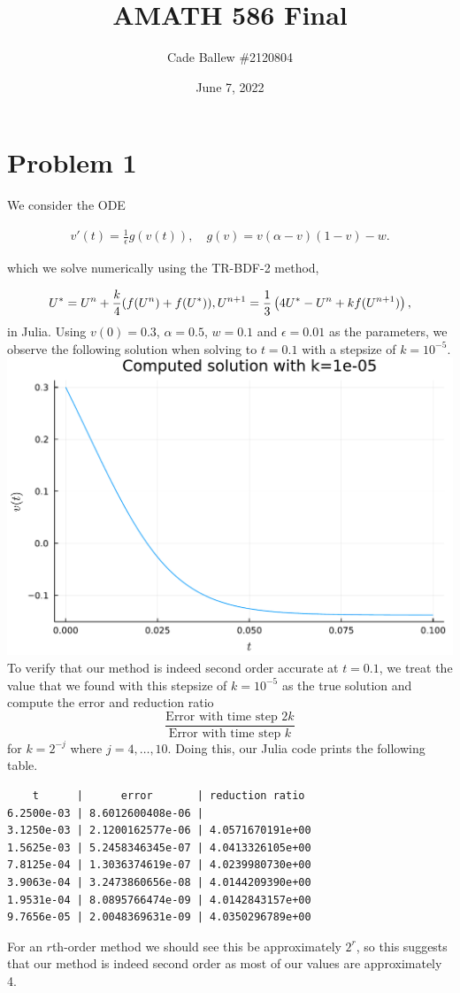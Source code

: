 \documentclass{article}
\title{AMATH 586 Final}
\author{Cade Ballew \#2120804}
\date{June 7, 2022}
\begin{document}
	
\maketitle
	
\section{Problem 1}
We consider the ODE 

\begin{align*} v'(t) = \frac 1 \epsilon g(v(t)), \quad g(v) = v (\alpha - v) (1-v) - w. \end{align*}

which we solve numerically using the TR-BDF-2 method,

\[U^* = U^n + \frac k 4 (f(U^n) + f(U^*)),\\
U^{n+1} = \frac 1 3 \left( 4 U^* -U^n + k f(U^{n+1})\right),\]
in Julia. Using \(v(0) = 0.3\), \(\alpha= 0.5\),
\(w = 0.1\) and \(\epsilon = 0.01\) as the parameters, we observe the following solution when solving to $t=0.1$ with a stepsize of $k=10^{-5}$. \\
\includegraphics[scale=0.5]{prob1.pdf}\\
To verify that our method is indeed second order accurate at $t=0.1$, we treat the value that we found with this stepsize of $k=10^{-5}$ as the true solution and compute the error and reduction ratio $$\frac{\text{Error with time step } 2k}{\text{Error with time step } k}$$ for $k=2^{-j}$ where $j=4,\ldots,10$. Doing this, our Julia code prints the following table. 
\begin{verbatim}
    t      |      error       | reduction ratio 
6.2500e-03 | 8.6012600408e-06 | 
3.1250e-03 | 2.1200162577e-06 | 4.0571670191e+00
1.5625e-03 | 5.2458346345e-07 | 4.0413326105e+00
7.8125e-04 | 1.3036374619e-07 | 4.0239980730e+00
3.9063e-04 | 3.2473860656e-08 | 4.0144209390e+00
1.9531e-04 | 8.0895766474e-09 | 4.0142843157e+00
9.7656e-05 | 2.0048369631e-09 | 4.0350296789e+00
\end{verbatim}
For an $r$th-order method we should see this be approximately $2^r$, so this suggests that our method is indeed second order as most of our values are approximately 4.
 
\end{document}
